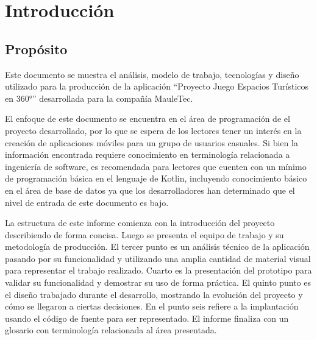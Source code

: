 \section{Introducción}
\subsection{Propósito}
Este documento se muestra el análisis, modelo de trabajo, tecnologías y diseño utilizado para la producción de la aplicación “Proyecto Juego Espacios Turísticos en 360°” desarrollada para la compañía MauleTec.

 El enfoque de este documento se encuentra en el área de programación de el proyecto desarrollado, por lo que se espera de los lectores tener un interés en la creación de aplicaciones móviles para un grupo de usuarios casuales. Si bien la información encontrada requiere conocimiento en terminología relacionada a ingeniería de software, es recomendada para lectores que cuenten con un mínimo de programación básica en el lenguaje de Kotlin, incluyendo conocimiento básico en el área de base de datos ya que los desarrolladores han determinado que el nivel de entrada de este documento es bajo. 
 
 La estructura de este informe comienza con la introducción del proyecto describiendo de forma concisa. Luego se presenta el equipo de trabajo y su metodología de producción. El tercer punto es un análisis técnico de la aplicación pasando por su funcionalidad y utilizando una amplia cantidad de material visual para representar el trabajo realizado. Cuarto es la presentación del prototipo para validar su funcionalidad y demostrar su uso de forma práctica. El quinto punto es el diseño trabajado durante el desarrollo, mostrando la evolución del proyecto y cómo se llegaron a ciertas decisiones. En el punto seis refiere a la implantación usando el código de fuente para ser representado. El informe finaliza con un glosario con terminología relacionada al área presentada.
